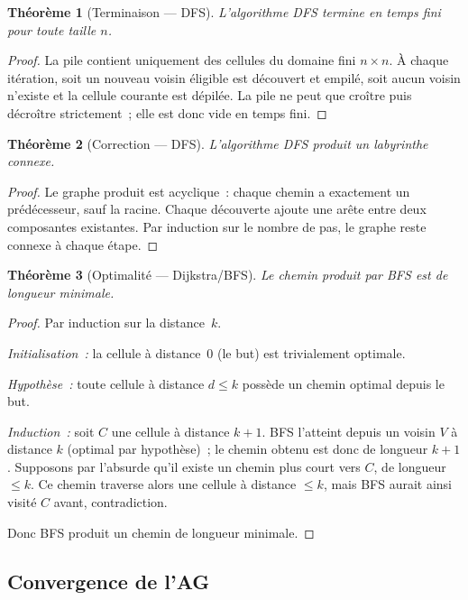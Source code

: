 \documentclass[12pt, a4paper]{article}
\newtheorem{theorem}{Théorème}[section]
\theoremstyle{definition}
\theoremstyle{remark}
\begin{document}
\begin{theorem}[Terminaison — DFS]
L'algorithme DFS termine en temps fini pour toute taille $n$.
\end{theorem}

\begin{proof}
La pile contient uniquement des cellules du domaine fini $n \times n$.
À chaque itération, soit un nouveau voisin éligible est découvert et empilé,
soit aucun voisin n'existe et la cellule courante est dépilée.
La pile ne peut que croître puis décroître strictement~; elle est donc vide en
temps fini.
\end{proof}

\begin{theorem}[Correction — DFS]
L'algorithme DFS produit un labyrinthe connexe.
\end{theorem}

\begin{proof}
Le graphe produit est acyclique~: chaque chemin a exactement un prédécesseur,
sauf la racine. Chaque découverte ajoute une arête entre deux composantes
existantes. Par induction sur le nombre de pas, le graphe reste connexe à chaque
étape.
\end{proof}

\begin{theorem}[Optimalité — Dijkstra/BFS]
Le chemin produit par BFS est de longueur minimale.
\end{theorem}

\begin{proof}
Par induction sur la distance~$k$.

\textit{Initialisation~:} la cellule à distance~0 (le but) est trivialement
optimale.

\textit{Hypothèse~:} toute cellule à distance $d \leq k$ possède un chemin
optimal depuis le but.

\textit{Induction~:} soit $C$ une cellule à distance $k+1$. BFS l'atteint depuis
un voisin $V$ à distance $k$ (optimal par hypothèse)~; le chemin obtenu est donc
de longueur $k+1$.
Supposons par l'absurde qu'il existe un chemin plus court vers $C$, de longueur
$\leq k$. Ce chemin traverse alors une cellule à distance $\leq k$, mais BFS
aurait ainsi visité $C$ avant, contradiction.

Donc BFS produit un chemin de longueur minimale.
\end{proof}

\subsection{Convergence de l'AG}
\end{document}
